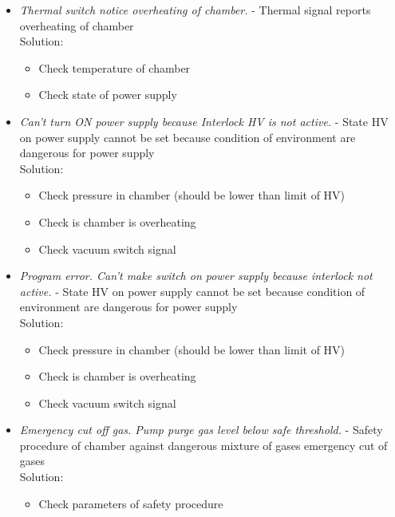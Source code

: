 \begin{itemize}
	\item \textit{Thermal switch notice overheating of chamber.} - Thermal signal reports overheating of chamber \\
 		Solution:
		\begin{itemize}
			\item Check temperature of chamber 
			\item Check state of power supply
		\end{itemize}

	\item \textit{Can't turn ON power supply because Interlock HV is not active.} - State HV on power supply cannot be set because condition of environment are dangerous for power supply  \\
 		Solution:
		\begin{itemize}
			\item Check pressure in chamber (should be lower than limit of HV)
			\item Check is chamber is overheating 
			\item Check vacuum switch signal
		\end{itemize}

	\item \textit{Program error. Can't make switch on power supply because interlock not active.} - State HV on power supply cannot be set because condition of environment are dangerous for power supply  \\
 		Solution:
		\begin{itemize}
			\item Check pressure in chamber (should be lower than limit of HV)
			\item Check is chamber is overheating 
			\item Check vacuum switch signal
		\end{itemize}

	\item \textit{Emergency cut off gas. Pump purge gas level below safe threshold.} - Safety procedure of chamber against dangerous mixture of gases emergency cut of gases  \\
 		Solution:
		\begin{itemize}
			\item Check parameters of safety procedure
		\end{itemize}

\end{itemize}

